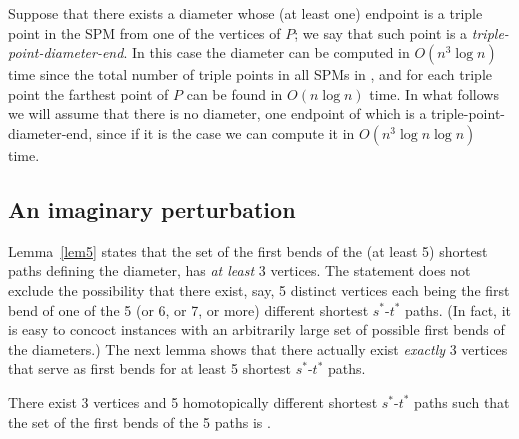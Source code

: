 \documentclass{llncs}
\newcommand{\e}[1]{\emph{#1}}
\renewcommand\-{\textrm{-}}
\renewcommand{\O}[1]{\ensuremath{O(#1 \log n)}\xspace}
\renewcommand\P{\ensuremath{P}\xspace}
\renewcommand\ss{\ensuremath{s^*}\xspace}
\renewcommand\tt{\ensuremath{t^*}\xspace}
\begin{document}
Suppose that there exists a diameter whose (at least one) endpoint is a triple
point in the SPM from one of the vertices of \P; we say that such point is a
\e{triple-point-diameter-end}. In this case the diameter can be computed in
\O{n^3} time since the total number of triple points in all SPMs in ,
and for each triple point the farthest point of \P can be found in \O{n} time.
In what follows we will assume that there is no diameter, one endpoint of which
is a triple-point-diameter-end, since if it is the case we can compute it in
\O{n^3 \log n} time.

\subsection{An imaginary perturbation}

Lemma~\ref{lem5} states that the set of the first bends of the (at least 5) shortest paths defining the diameter, has \e{at least} 3 vertices. The statement does not exclude the possibility that there exist, say, 5 distinct vertices each being the first bend of one of the 5 (or 6, or 7, or more) different shortest \ss-\tt paths. (In fact, it is easy to concoct instances with an arbitrarily large set of possible first bends of the diameters.) The next lemma shows that there actually exist \e{exactly} 3 vertices that serve as first bends for at least 5 shortest \ss-\tt paths.
\begin{lemma}\label{pert}There exist 3 vertices  and 5 homotopically different shortest \ss-\tt paths such that the set of the first bends of the 5 paths is .\end{lemma}
\end{document}
